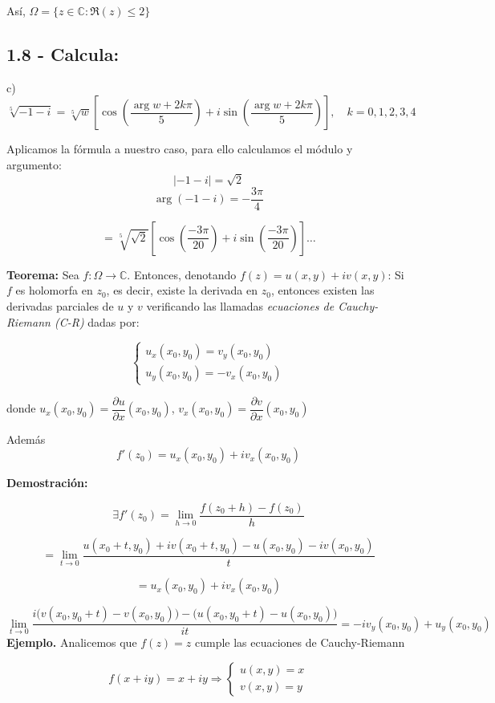 \documentclass[a4paper,12pt]{article}
\begin{document}
Así, $\Omega = \{ z \in \mathbb{C} : \Re(z) \leq 2 \}$

\subsection*{1.8 - Calcula:}

c) 
\[
\sqrt[5]{-1 - i} = \sqrt[5]{w} \left[ \cos\left( \frac{\arg w + 2k\pi}{5} \right) + i \sin\left( \frac{\arg w + 2k\pi}{5} \right) \right], \quad k = 0, 1, 2, 3, 4
\]

Aplicamos la fórmula a nuestro caso, para ello calculamos el módulo y argumento:
\[
|-1 - i| = \sqrt{2}
\]
\[
\arg(-1 - i) = -\frac{3\pi}{4}
\]

\[
= \sqrt[5]{\sqrt{2}} \left[ \cos\left( \frac{-3\pi}{20} \right) + i \sin\left( \frac{-3\pi}{20} \right) \right] \ldots
\]

\textbf{Teorema:} Sea $f: \Omega \rightarrow \mathbb{C}$. Entonces, denotando $f(z) = u(x, y) + iv(x, y)$:  
Si $f$ es holomorfa en $z_0$, es decir, existe la derivada en $z_0$, entonces existen las derivadas parciales de $u$ y $v$ verificando las llamadas \textit{ecuaciones de Cauchy-Riemann (C-R)} dadas por:

\[
\begin{cases}
u_x(x_0, y_0) = v_y(x_0, y_0) \\
u_y(x_0, y_0) = -v_x(x_0, y_0)
\end{cases}
\]

donde $u_x(x_0, y_0) = \dfrac{\partial u}{\partial x}(x_0, y_0)$, $v_x(x_0, y_0) = \dfrac{\partial v}{\partial x}(x_0, y_0)$

Además
\[
f'(z_0) = u_x(x_0, y_0) + i v_x(x_0, y_0)
\]

\textbf{Demostración:}

\[
\exists f'(z_0) = \lim_{h \to 0} \frac{f(z_0 + h) - f(z_0)}{h}
\]

\[
= \lim_{t \to 0} \frac{u(x_0 + t, y_0) + i v(x_0 + t, y_0) - u(x_0, y_0) - i v(x_0, y_0)}{t}
\]

\[
= u_x(x_0, y_0) + i v_x(x_0, y_0)
\]

\[
\lim_{t \to 0} \frac{i \big( v(x_0, y_0 + t) - v(x_0, y_0) \big) - \big( u(x_0, y_0 + t) - u(x_0, y_0) \big)}{it} = -i v_y(x_0, y_0) + u_y(x_0, y_0)
\]
\newpage
\textbf{Ejemplo.} Analicemos que $f(z) = z$ cumple las ecuaciones de Cauchy-Riemann

\[
f(x + iy) = x + iy \Rightarrow
\begin{cases}
u(x, y) = x \\
v(x, y) = y
\end{cases}
\]
\end{document}
